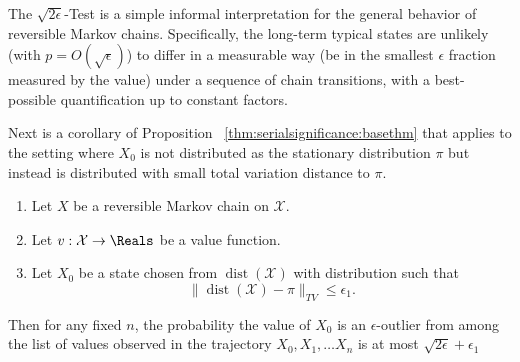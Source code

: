\documentclass[12pt]{article}
\begin{document}
\begin{remark}
    The \( \sqrt{2\epsilon} \)-Test is a simple informal interpretation
    for the general behavior of reversible Markov chains.  Specifically,
    the long-term typical states are unlikely (with \(
    p = O(\sqrt{\epsilon}) \)) to differ in a measurable way (be in the
    smallest \( \epsilon \) fraction measured by the value) under a
    sequence of chain transitions, with a best-possible quantification
    up to constant factors.
\end{remark}

Next is a corollary of Proposition~%
\ref{thm:serialsignificance:basethm} that applies to the setting where \(
X_0 \) is not distributed as the stationary distribution \( \pi \) but
instead is distributed with small total variation distance to \( \pi \).

\begin{corollary}
    \begin{enumerate}
        \item
            Let \( X \) be a reversible Markov chain on \( \mathcal{X} \).
        \item
            Let \( v :  \mathcal{X} \to \Reals \) be a value function.
        \item
            Let \( X_0 \) be a state chosen from \(
            \operatorname{dist}
            (\mathcal{X}) \) with distribution such that
            \[
                \|
                \operatorname{dist}
                (\mathcal{X}) - \pi \|_{TV} \le \epsilon_1.
            \]
    \end{enumerate}
    Then for any fixed \( n \), the probability the value of \( X_0 \)
    is an \( \epsilon \)-outlier from among the list of values observed
    in the trajectory \( X_0, X_1, \dots X_n \) is at most \( \sqrt{2\epsilon}
    + \epsilon_1 \)
\end{corollary}
\end{document}
